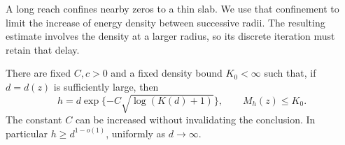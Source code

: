 A long reach confines nearby zeros to a thin slab.  We use that
confinement to limit the increase of energy density between successive
radii.  The resulting estimate involves the density at a larger radius,
so its discrete iteration must retain that delay.

\begin{lemma}\label{lem:reach-density-window}
There are fixed $C,c>0$ and a fixed density bound $K_0<\infty$
such that, if $d=d(z)$ is sufficiently large, then
\begin{equation}\label{eq:C1}
 h=d\exp\{-C\sqrt{\log(K(d)+1)}\},\qquad M_h(z)\le K_0.
\end{equation}
The constant $C$ can be increased without invalidating the conclusion.
In particular $h\ge d^{1-o(1)}$, uniformly as $d\to\infty$.
\end{lemma}

